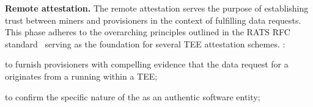\noindent\textbf{Remote attestation.} The remote attestation serves the purpose of establishing trust between miners and provisioners in the context of fulfilling data requests. This phase adheres to the overarching principles outlined in the RATS RFC standard~\citep{rfc9334} serving as the foundation for several TEE attestation schemes. : \begin{inparaenum}
    \item to furnish provisioners with compelling evidence that the data request for a  originates from a  running within a TEE;
    \item to confirm the specific nature of the  as an authentic  software entity;
    \item {}
\end{inparaenum}

